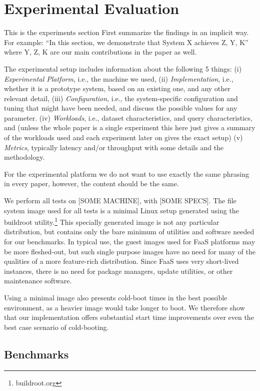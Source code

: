\section{Experimental Evaluation} \label{sec:experiments}
This is the experiments section
First summarize the findings in an implicit way. For example:
``In this section, we demonstrate that System X achieves Z, Y, K''
where Y, Z, K are our main contributions in the paper as well.

The experimental setup includes information about the following 5 things:
(i) \textit{Experimental Platform}, i.e., the machine we used,
(ii) \textit{Implementation}, i.e., whether it is a prototype system, based on an existing one, and any other relevant detail,
(iii) \textit{Configuration}, i.e., the system-specific configuration and tuning that might have been needed, and discuss the possible values for any parameter.
(iv) \textit{Workloads}, i.e., dataset characteristics, and query characteristics, and (unless the whole paper is a single experiment this here just gives a summary of the workloads used and each experiment later on gives the exact setup)
(v) \textit{Metrics}, typically latency and/or throughput with some details and the
methodology.

For the experimental platform we do
not want to use exactly the same phrasing in every paper, however, the content should
be the same.

We perform all tests on [SOME MACHINE], with [SOME SPECS]. The file system image used for all tests is a minimal Linux setup generated using the buildroot utility.\footnote{buildroot.org} This specially generated image is not any particular distribution, but contains only the bare minimum of utilities and software needed for our benchmarks. In typical use, the guest images used for FaaS platforms may be more fleshed-out, but such single purpose images have no need for many of the qualities of a more feature-rich distribution. Since FaaS uses very short-lived instances, there is no need for package managers, update utilities, or other maintenance software.

Using a minimal image also presents cold-boot times in the best possible environment, as a heavier image would take longer to boot. We therefore show that our implementation offers substantial start time improvements over even the best case scenario of cold-booting.

\subsection{Benchmarks}


